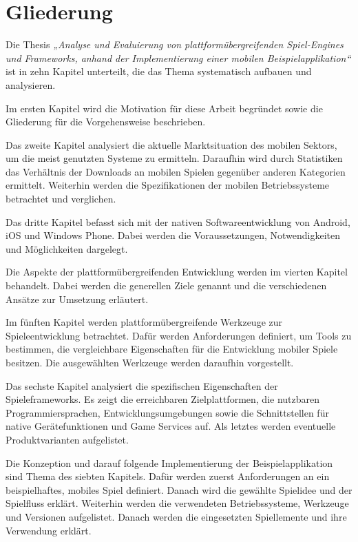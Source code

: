 \section{Gliederung}
Die Thesis \emph{„Analyse und Evaluierung von plattformübergreifenden Spiel-Engines und Frameworks, anhand der Implementierung einer mobilen Beispielapplikation“} ist in zehn Kapitel unterteilt, die das Thema systematisch aufbauen und analysieren.

\bigskip
Im ersten Kapitel wird die Motivation für diese Arbeit begründet sowie die Gliederung für die Vorgehensweise beschrieben.

\bigskip
Das zweite Kapitel analysiert die aktuelle Marktsituation des mobilen Sektors, um die meist genutzten Systeme zu ermitteln. Daraufhin wird durch Statistiken das Verhältnis der Downloads an mobilen Spielen gegenüber anderen Kategorien ermittelt. Weiterhin werden die Spezifikationen der mobilen Betriebssysteme betrachtet und verglichen. 

\bigskip
Das dritte Kapitel befasst sich mit der nativen Softwareentwicklung von Android, iOS und Windows Phone. Dabei werden die Voraussetzungen, Notwendigkeiten und Möglichkeiten dargelegt.

\bigskip
Die Aspekte der plattformübergreifenden Entwicklung werden im vierten Kapitel behandelt. Dabei werden die generellen Ziele genannt und die verschiedenen Ansätze zur Umsetzung erläutert. 

\bigskip
Im fünften Kapitel werden plattformübergreifende Werkzeuge zur Spieleentwicklung betrachtet. Dafür werden Anforderungen definiert, um Tools zu bestimmen, die vergleichbare Eigenschaften für die Entwicklung mobiler Spiele besitzen. Die ausgewählten Werkzeuge werden daraufhin vorgestellt.

\bigskip
Das sechste Kapitel analysiert die spezifischen Eigenschaften der Spieleframeworks. Es zeigt die erreichbaren Zielplattformen, die nutzbaren Programmiersprachen, Entwicklungsumgebungen sowie die Schnittstellen für native Gerätefunktionen und Game Services auf. Als letztes werden eventuelle Produktvarianten aufgelistet.

\bigskip
Die Konzeption und darauf folgende Implementierung der Beispielapplikation sind Thema des siebten Kapitels. Dafür werden zuerst Anforderungen an ein beispielhaftes, mobiles Spiel definiert. Danach wird die gewählte Spielidee und der Spielfluss erklärt. Weiterhin werden die verwendeten Betriebssysteme, Werkzeuge und Versionen aufgelistet. Danach werden die eingesetzten Spiellemente und ihre Verwendung erklärt.

